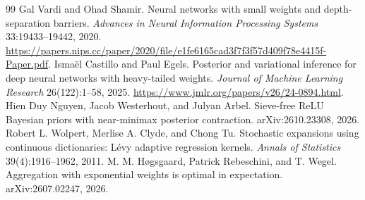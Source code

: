 \documentclass[11pt]{article}
\begin{document}
\begin{thebibliography}{99}
 Gal Vardi and Ohad Shamir. Neural networks with small weights and depth-separation barriers. \emph{Advances in Neural Information Processing Systems} 33:19433--19442, 2020. \url{https://papers.nips.cc/paper/2020/file/e1fe6165cad3f7f3f57d409f78e4415f-Paper.pdf}.
 Isma\"el Castillo and Paul Egels. Posterior and variational inference for deep neural networks with heavy-tailed weights. \emph{Journal of Machine Learning Research} 26(122):1--58, 2025. \url{https://www.jmlr.org/papers/v26/24-0894.html}.
 Hien Duy Nguyen, Jacob Westerhout, and Julyan Arbel. Sieve-free ReLU Bayesian priors with near-minimax posterior contraction. arXiv:2610.23308, 2026.
 Robert L. Wolpert, Merlise A. Clyde, and Chong Tu. Stochastic expansions using continuous dictionaries: L\'evy adaptive regression kernels. \emph{Annals of Statistics} 39(4):1916--1962, 2011.
 M. M. H\o gsgaard, Patrick Rebeschini, and T. Wegel. Aggregation with exponential weights is optimal in expectation. arXiv:2607.02247, 2026.
\end{thebibliography}
\end{document}
